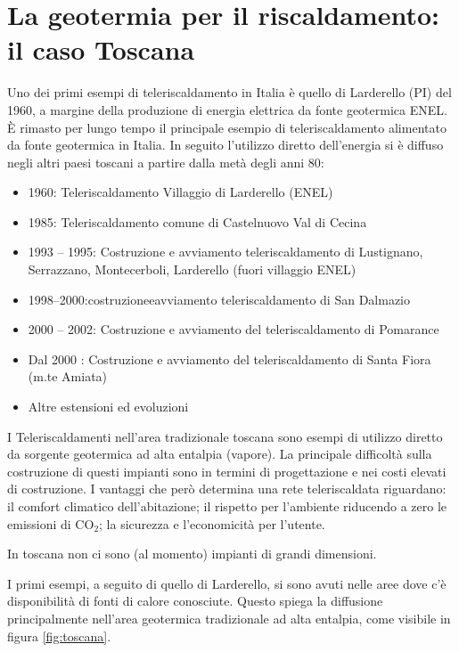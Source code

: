 \documentclass[laurea,oneside,11pt]{USiena_tesiLM}
\begin{document}
\section{La geotermia per il riscaldamento: il caso Toscana}
Uno dei primi esempi di teleriscaldamento in Italia è quello di Larderello (PI) del 1960, a margine della produzione di energia elettrica da fonte geotermica ENEL. È rimasto per lungo tempo il principale esempio di teleriscaldamento alimentato da fonte geotermica in Italia.
In seguito l'utilizzo diretto dell'energia si è diffuso negli altri paesi toscani a partire dalla metà degli anni 80: 
\begin{itemize}
\item 1960: Teleriscaldamento Villaggio di Larderello
(ENEL)
\item 1985: Teleriscaldamento comune di Castelnuovo Val di Cecina
\item 1993 – 1995: Costruzione e avviamento teleriscaldamento di Lustignano, Serrazzano, Montecerboli, Larderello (fuori villaggio ENEL)
\item 1998–2000:costruzioneeavviamento teleriscaldamento di San Dalmazio
\item 2000 – 2002: Costruzione e avviamento del teleriscaldamento di Pomarance
\item Dal 2000 : Costruzione e avviamento del teleriscaldamento di Santa Fiora (m.te Amiata)
\item Altre estensioni ed evoluzioni
\end{itemize}

I Teleriscaldamenti nell'area tradizionale toscana sono esempi di utilizzo diretto da sorgente geotermica ad alta entalpia (vapore). La principale difficoltà sulla costruzione di questi impianti sono in termini di progettazione e nei costi elevati di costruzione. I vantaggi che però determina una rete teleriscaldata riguardano: il comfort climatico dell'abitazione; il rispetto per l'ambiente riducendo a zero le emissioni di CO$_2$; la sicurezza e l'economicità per l'utente. 

In toscana non ci sono (al momento) impianti di grandi dimensioni.

I primi esempi, a seguito di quello di Larderello, si sono avuti nelle aree dove c'è disponibilità di fonti di calore conosciute.
Questo spiega la diffusione principalmente nell'area geotermica tradizionale ad alta entalpia, come visibile in figura \ref{fig:toscana}.
\end{document}
